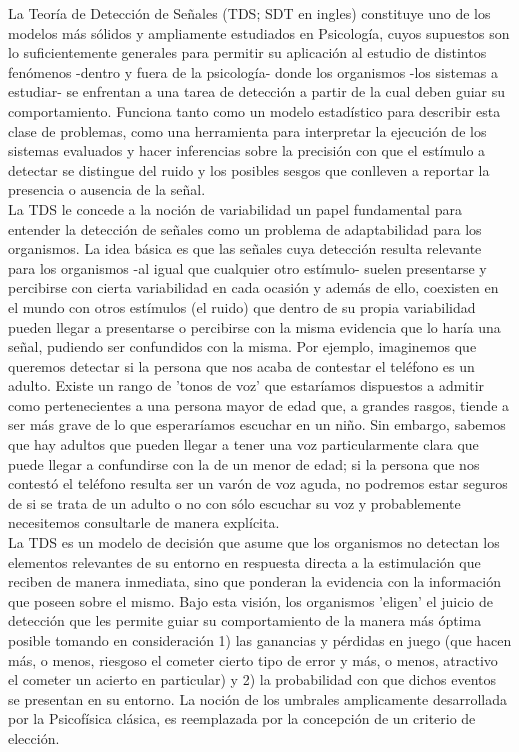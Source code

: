 La Teoría de Detección de Señales (TDS; SDT en ingles) constituye uno de los modelos más sólidos y ampliamente estudiados en Psicología, cuyos supuestos son lo suficientemente generales para permitir su aplicación al estudio de distintos fenómenos -dentro y fuera de la psicología- donde los organismos -los sistemas a estudiar- se enfrentan a una tarea de detección a partir de la cual deben guiar su comportamiento. Funciona tanto como un modelo estadístico para describir esta clase de problemas, como una herramienta para interpretar la ejecución de los sistemas evaluados y hacer inferencias sobre la precisión con que el estímulo a detectar se distingue del ruido y los posibles sesgos que conlleven a reportar la presencia o ausencia de la señal.\\

La TDS le concede a la noción de variabilidad un papel fundamental para entender la detección de señales como un problema de adaptabilidad para los organismos. La idea básica es que las señales cuya detección resulta relevante para los organismos -al igual que cualquier otro estímulo- suelen presentarse y percibirse con cierta variabilidad en cada ocasión y además de ello, coexisten en el mundo con otros estímulos (el ruido) que dentro de su propia variabilidad pueden llegar a presentarse o percibirse con la misma evidencia que lo haría una señal, pudiendo ser confundidos con la misma. Por ejemplo, imaginemos que queremos detectar si la persona que nos acaba de contestar el teléfono es un adulto. Existe un rango de 'tonos de voz' que estaríamos dispuestos a admitir como pertenecientes a una persona mayor de edad que, a grandes rasgos, tiende a ser más grave de lo que esperaríamos escuchar en un niño. Sin embargo, sabemos que hay adultos que pueden llegar a tener una voz particularmente clara que puede llegar a confundirse con la de un menor de edad; si la persona que nos contestó el teléfono resulta ser un varón de voz aguda, no podremos estar seguros de si se trata de un adulto o no con sólo escuchar su voz y probablemente necesitemos consultarle de manera explícita.\\

La TDS es un modelo de decisión que asume que los organismos no detectan los elementos relevantes de su entorno en respuesta directa a la estimulación que reciben de manera inmediata, sino que ponderan la evidencia con la información que poseen sobre el mismo. Bajo esta visión, los organismos 'eligen' el juicio de detección que les permite guiar su comportamiento de la manera más óptima posible tomando en consideración 1) las ganancias y pérdidas en juego (que hacen más, o menos, riesgoso el cometer cierto tipo de error y más, o menos, atractivo el cometer un acierto en particular) y 2) la probabilidad con que dichos eventos se presentan en su entorno.  La noción de los umbrales amplicamente desarrollada por la Psicofísica clásica, es reemplazada por la concepción de un criterio de elección.\\ 

